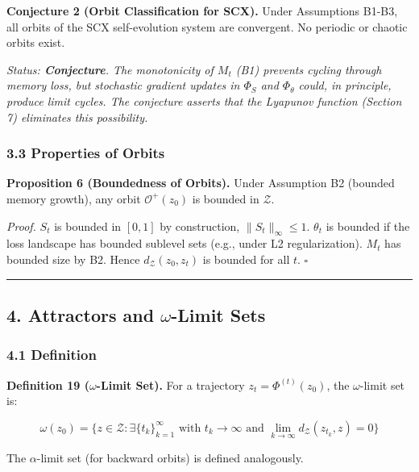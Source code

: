 \documentclass[
  12pt,
]{article}
\begin{document}
\textbf{Conjecture 2 (Orbit Classification for SCX).} Under Assumptions
B1-B3, all orbits of the SCX self-evolution system are convergent. No
periodic or chaotic orbits exist.

\emph{Status: \textbf{Conjecture}. The monotonicity of \(M_t\) (B1)
prevents cycling through memory loss, but stochastic gradient updates in
\(\Phi_S\) and \(\Phi_\theta\) could, in principle, produce limit
cycles. The conjecture asserts that the Lyapunov function (Section 7)
eliminates this possibility.}

\subsubsection{3.3 Properties of Orbits}\label{properties-of-orbits}

\textbf{Proposition 6 (Boundedness of Orbits).} Under Assumption B2
(bounded memory growth), any orbit \(\mathcal{O}^+(z_0)\) is bounded in
\(\mathcal{Z}\).

\emph{Proof.} \(S_t\) is bounded in \([0,1]\) by construction,
\(\|S_t\|_\infty \leq 1\). \(\theta_t\) is bounded if the loss landscape
has bounded sublevel sets (e.g., under L2 regularization). \(M_t\) has
bounded size by B2. Hence \(d_{\mathcal{Z}}(z_0, z_t)\) is bounded for
all \(t\). \(\square\)

\begin{center}\rule{0.5\linewidth}{0.5pt}\end{center}

\subsection{\texorpdfstring{4. Attractors and \(\omega\)-Limit
Sets}{4. Attractors and \textbackslash omega-Limit Sets}}\label{attractors-and-omega-limit-sets}

\subsubsection{4.1 Definition}\label{definition-1}

\textbf{Definition 19 (\(\omega\)-Limit Set).} For a trajectory
\(z_t = \Phi^{(t)}(z_0)\), the \(\omega\)-limit set is:

\[\omega(z_0) = \bigl\{ z \in \mathcal{Z} : \exists \{t_k\}_{k=1}^\infty \text{ with } t_k \to \infty \text{ and } \lim_{k\to\infty} d_{\mathcal{Z}}(z_{t_k}, z) = 0 \bigr\}\]

The \(\alpha\)-limit set (for backward orbits) is defined analogously.
\end{document}
